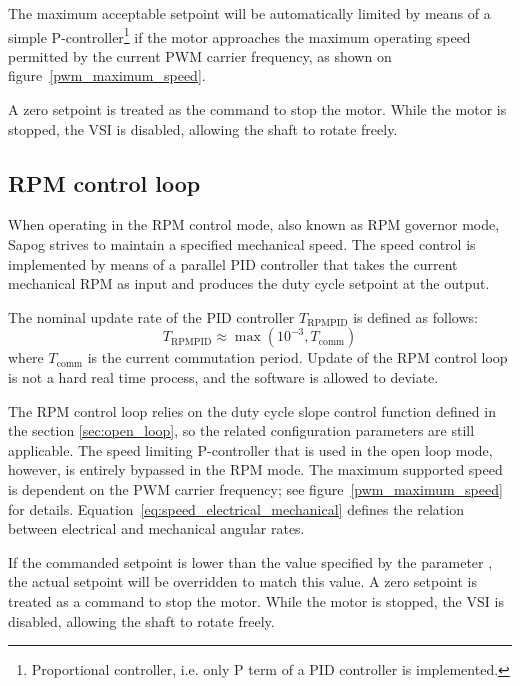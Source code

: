 \documentclass{zubaxdoc}
\begin{document}
	The maximum acceptable setpoint will be automatically limited by means of a simple
	P-controller\footnote{Proportional controller, i.e. only P term of a PID controller is implemented.}
	if the motor approaches the maximum operating speed permitted by the
	current PWM carrier frequency, as shown on figure~\ref{pwm_maximum_speed}.
	
	A zero setpoint is treated as the command to stop the motor.
	While the motor is stopped, the VSI is disabled, allowing the shaft to rotate freely.
	
	\subsection{RPM control loop}\label{sec:rpm_loop}
	
	When operating in the RPM control mode, also known as RPM governor mode,
	Sapog strives to maintain a specified mechanical speed.
	The speed control is implemented by means of a parallel PID controller
	that takes the current mechanical RPM as input and
	produces the duty cycle setpoint at the output.
	
	The nominal update rate of the PID controller $T_{\text{RPMPID}}$ is defined as follows:
	\begin{equation}\label{eq:rpm_pid_control_loop_period}
		T_{\text{RPMPID}} \approx \max \left(10^{-3},T_{\text{comm}}\right)
	\end{equation}
	where $T_\text{comm}$ is the current commutation period.
	Update of the RPM control loop is not a hard real time process, and the software is allowed to
	deviate.
	
	The RPM control loop relies on the duty cycle slope control function defined in the section
	\ref{sec:open_loop}, so the related configuration parameters are still applicable.
	The speed limiting P-controller that is used in the open loop mode, however,
	is entirely bypassed in the RPM mode.
	The maximum supported speed is dependent on the PWM carrier frequency;
	see figure~\ref{pwm_maximum_speed} for details.
	Equation~\ref{eq:speed_electrical_mechanical} defines the relation between electrical
	and mechanical angular rates.
	
	If the commanded setpoint is lower than the value specified by the parameter \mbox{,}
	the actual setpoint will be overridden to match this value.
	A zero setpoint is treated as a command to stop the motor.
	While the motor is stopped, the VSI is disabled, allowing the shaft to rotate freely.
	
\end{document}
